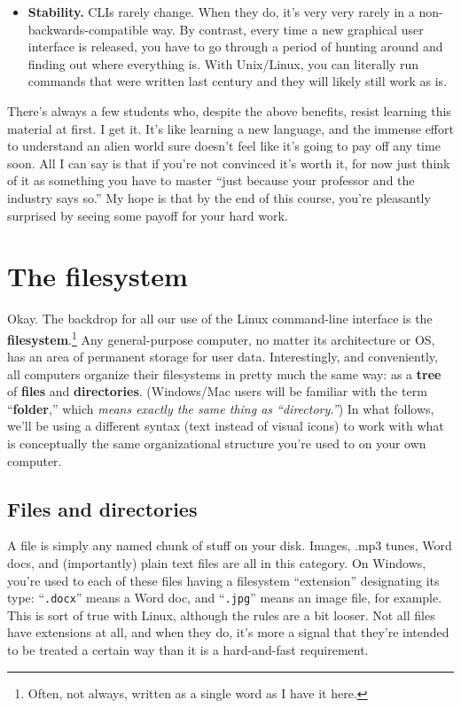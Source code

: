 \begin{itemize}
\item \textbf{Stability.} CLIs rarely change. When they do, it's very very
rarely in a non-backwards-compatible way. By contrast, every time a new
graphical user interface is released, you have to go through a period of
hunting around and finding out where everything is. With Unix/Linux, you can
literally run commands that were written last century and they will likely
still work as is.

\end{itemize}

There's always a few students who, despite the above benefits, resist learning
this material at first. I get it. It's like learning a new language, and the
immense effort to understand an alien world sure doesn't feel like it's going
to pay off any time soon. All I can say is that if you're not convinced it's
worth it, for now just think of it as something you have to master ``just
because your professor and the industry says so.'' My hope is that by the end
of this course, you're pleasantly surprised by seeing some payoff for your
hard work.


\section{The filesystem}

Okay. The backdrop for all our use of the Linux command-line interface is the
\textbf{filesystem}.\footnote{Often, not always, written as a single word as I
have it here.} Any general-purpose computer, no matter its architecture or OS,
has an area of permanent storage for user data. Interestingly, and
conveniently, all computers organize their filesystems in pretty much the same
way: as a \textbf{tree} of \textbf{files} and \textbf{directories}.
(Windows/Mac users will be familiar with the term ``\textbf{folder},'' which
\textit{means exactly the same thing as ``directory.''}) In what follows, we'll
be using a different syntax (text instead of visual icons) to work with what is
conceptually the same organizational structure you're used to on your own
computer.

\subsection{Files and directories}

A file is simply any named chunk of stuff on your disk. Images, .mp3 tunes,
Word docs, and (importantly) plain text files are all in this category. On
Windows, you're used to each of these files having a filesystem ``extension''
designating its type: ``\texttt{.docx}'' means a Word doc, and
``\texttt{.jpg}'' means an image file, for example. This is sort of true with
Linux, although the rules are a bit looser. Not all files have extensions at
all, and when they do, it's more a signal that they're intended to be treated a
certain way than it is a hard-and-fast requirement.

